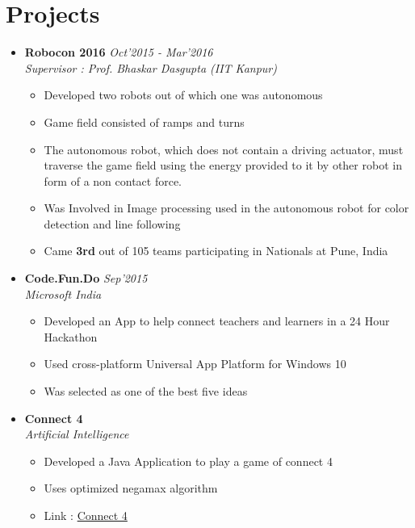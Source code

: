 \documentclass[11pt,a4paper]{moderncv}
\newcommand{\experience}[3]{
  \item \textbf{\large{#1}} \hfill\textit{#2}\\ \emph{#3}\vspace{2mm}
}
\begin{document}
  \section{Projects}
    \begin{itemize}
      \experience{Robocon 2016}{Oct'2015 - Mar'2016}{Supervisor : Prof. Bhaskar Dasgupta (IIT Kanpur)}
      \begin{itemize}
        \item Developed two robots out of which one was autonomous\vspace{2mm}
        \item Game field consisted of ramps and turns\vspace{2mm}
        \item The autonomous robot, which does not contain a driving actuator, must traverse the game field using the energy provided to it by other robot in form of a non contact force.\vspace{2mm}
        \item Was Involved in Image processing used in the autonomous robot for color detection and line following\vspace{2mm}
        \item Came \textbf{3rd} out of 105 teams participating in Nationals at Pune, India\vspace{4mm}
      \end{itemize}
      \experience{Code.Fun.Do}{Sep'2015}{Microsoft India}
      \begin{itemize}
        \item Developed an App to help connect teachers and learners in a 24 Hour Hackathon\vspace{2mm}
        \item Used cross-platform Universal App Platform for Windows 10 \vspace{2mm}
        \item Was selected as one of the best five ideas \vspace{4mm}
      \end{itemize}
      \newpage
      \experience{Connect 4}{}{Artificial Intelligence}
      \begin{itemize}
        \item Developed a Java Application to play a game of connect 4\vspace{2mm}
        \item Uses optimized negamax algorithm\vspace{2mm}
        \item Link : \href{http://github.com/yashsriv/Connect-4}{Connect 4}\vspace{4mm}
      \end{itemize}
    \end{itemize}
\end{document}
